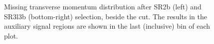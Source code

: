 \begin{figure}[h!]
\centering
{}
\caption{Missing transverse momentum distribution after SR2b (left) and SR3l3b (bottom-right) selection, beside the \met cut. The results in the auxiliary signal regions are shown in the last (inclusive) bin of each plot.}
\label{fig:Results_auxSR_metD} 
\end{figure}

